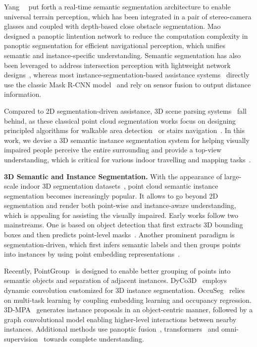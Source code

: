 \documentclass[10pt,twocolumn,letterpaper]{article}
\begin{document}
Yang~\etal~\cite{yang2018unifying} put forth a real-time semantic segmentation architecture to enable universal terrain perception, which has been integrated in a pair of stereo-camera glasses and coupled with depth-based close obstacle segmentation. Mao~\etal~\cite{mao2021panoptic} designed a panoptic lintention network to reduce the computation complexity in panoptic segmentation for efficient navigational perception, which unifies semantic and instance-specific understanding. Semantic segmentation has also been leveraged to address intersection perception with lightweight network designs~\cite{cao2020rapid,hsieh2020outdoor}, whereas most instance-segmentation-based assistance systems~\cite{long2019unifying,yohannes2019content} directly use the classic Mask R-CNN model~\cite{he2017mask} and rely on sensor fusion to output distance information.

Compared to 2D segmentation-driven assistance, 3D scene parsing systems~\cite{caraiman2017computer,yang2015new,zatout2019ego} fall behind, as these classical point cloud segmentation works focus on designing principled algorithms for walkable area detection~\cite{aladren2014navigation,wang2017enabling,zatout2019ego} or stairs navigation~\cite{perez2017stairs,yang2015new,ye20173}. In this work, we devise a 3D semantic instance segmentation system for helping visually impaired people perceive the entire surrounding and provide a top-view understanding, which is critical for various indoor travelling and mapping tasks~\cite{hu2019indoor,li2016isana,li2018semantic,liu2020indoor}. 

\noindent\textbf{3D Semantic and Instance Segmentation.}
With the appearance of large-scale indoor 3D segmentation datasets~\cite{S3DIS,scannet}, point cloud semantic instance segmentation becomes increasingly popular. It allows to go beyond 2D segmentation and render both point-wise and instance-aware understanding, which is appealing for assisting the visually impaired. Early works follow two mainstreams. One is based on object detection that first extracts 3D bounding boxes and then predicts point-level masks~\cite{hou20193d,yang2019learning,yi2019gspn}. Another prominent paradigm is segmentation-driven, which first infers semantic labels and then groups points into instances by using point embedding representations~\cite{lahoud20193d,liu2019masc,pham2019jsis3d,wang2018sgpn,wang2019associatively}.

Recently, PointGroup~\cite{pointgroup} is designed to enable better grouping of points into semantic objects and separation of adjacent instances. DyCo3D~\cite{dyco3d} employs dynamic convolution customized for 3D instance segmentation. OccuSeg~\cite{han2020occuseg} relies on multi-task learning by coupling embedding learning and occupancy regression. 3D-MPA~\cite{engelmann20203d} generates instance proposals in an object-centric manner, followed by a graph convolutional model enabling higher-level interactions between nearby instances. Additional methods use panoptic fusion~\cite{jaus2021panoramic,narita2019panopticfusion,wu2021scenegraphfusion}, transformers~\cite{guo2020pct,zhao2020point} and omni-supervision~\cite{omni_point,yang2020omnisupervised} towards complete understanding.
\end{document}
